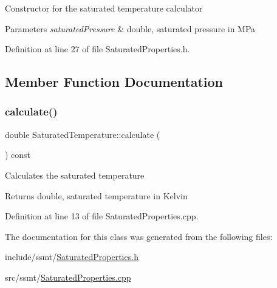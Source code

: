 Constructor for the saturated temperature calculator 
\begin{DoxyParams}{Parameters}
{\em saturated\+Pressure} & double, saturated pressure in M\+Pa \\
\hline
\end{DoxyParams}


Definition at line 27 of file Saturated\+Properties.\+h.



\subsection{Member Function Documentation}
\mbox{\label{class_saturated_temperature_a4aa0d2a337289dd36f4e063f1f67aaa5}} 
\subsubsection{\texorpdfstring{calculate()}{calculate()}}
{\footnotesize\ttfamily double Saturated\+Temperature\+::calculate (\begin{DoxyParamCaption}{ }\end{DoxyParamCaption}) const}

Calculates the saturated temperature \begin{DoxyReturn}{Returns}
double, saturated temperature in Kelvin 
\end{DoxyReturn}


Definition at line 13 of file Saturated\+Properties.\+cpp.



The documentation for this class was generated from the following files\+:\begin{DoxyCompactItemize}
\item 
include/ssmt/\hyperlink{_saturated_properties_8h}{Saturated\+Properties.\+h}\item 
src/ssmt/\hyperlink{_saturated_properties_8cpp}{Saturated\+Properties.\+cpp}\end{DoxyCompactItemize}
